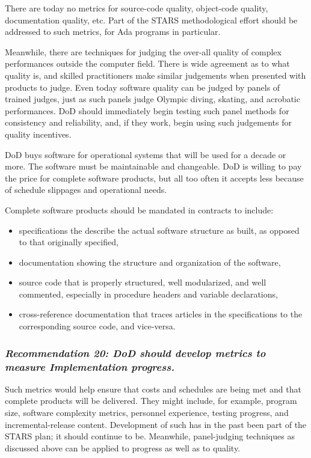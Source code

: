 \documentclass[12pt,final]{article}
\begin{document}
There are today no metrics for source-code quality, object-code quality,
documentation quality, etc. Part of the STARS methodological effort should be
addressed to such metrics, for Ada programs in particular.

Meanwhile, there are techniques for judging the over-all quality of complex
performances outside the computer field. There is wide agreement as to what
quality is, and skilled practitioners make similar judgements when presented
with products to judge. Even today software quality can be judged by panels of
trained judges, just as such panels judge Olympic diving, skating, and
acrobatic performances. DoD should immediately begin testing such panel methods
for consistency and reliability, and, if they work, begin using such judgements
for quality incentives.

DoD buys software for operational systems that will be used for a decade or
more. The software must be maintainable and changeable. DoD is willing to pay
the price for complete software products, but all too often it accepts less
because of schedule slippages and operational needs.

Complete software products should be mandated in contracts to include:

\begin{itemize}
    \item specifications the describe the actual software structure as built,
        as opposed to that originally specified,
    \item documentation showing the structure and organization of the software,
    \item source code that is properly structured, well modularized, and well
        commented, especially in procedure headers and variable declarations,
    \item cross-reference documentation that traces articles in the
        specifications to the corresponding source code, and vice-versa.
\end{itemize}

\subsubsection*{\textit{Recommendation 20: DoD should develop metrics to
measure Implementation progress.}}

Such metrics would help ensure that costs and schedules are being met and that
complete products will be delivered. They might include, for example, program
size, software complexity metrics, personnel experience, testing progress, and
incremental-release content. Development of such has in the past been part of
the STARS plan; it should continue to be. Meanwhile, panel-judging techniques
as discussed above can be applied to progress as well as to quality.
\end{document}
